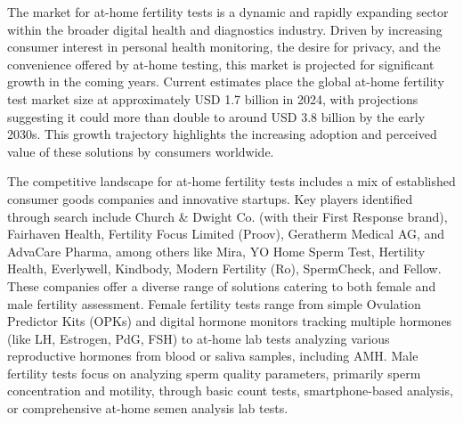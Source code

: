 \documentclass{article}
\begin{document}
The market for at-home fertility tests is a dynamic and rapidly expanding sector within the broader digital health and diagnostics industry. Driven by increasing consumer interest in personal health monitoring, the desire for privacy, and the convenience offered by at-home testing, this market is projected for significant growth in the coming years. Current estimates place the global at-home fertility test market size at approximately USD 1.7 billion in 2024, with projections suggesting it could more than double to around USD 3.8 billion by the early 2030s. This growth trajectory highlights the increasing adoption and perceived value of these solutions by consumers worldwide.

The competitive landscape for at-home fertility tests includes a mix of established consumer goods companies and innovative startups. Key players identified through search include Church \& Dwight Co. (with their First Response brand), Fairhaven Health, Fertility Focus Limited (Proov), Geratherm Medical AG, and AdvaCare Pharma, among others like Mira, YO Home Sperm Test, Hertility Health, Everlywell, Kindbody, Modern Fertility (Ro), SpermCheck, and Fellow. These companies offer a diverse range of solutions catering to both female and male fertility assessment. Female fertility tests range from simple Ovulation Predictor Kits (OPKs) and digital hormone monitors tracking multiple hormones (like LH, Estrogen, PdG, FSH) to at-home lab tests analyzing various reproductive hormones from blood or saliva samples, including AMH. Male fertility tests focus on analyzing sperm quality parameters, primarily sperm concentration and motility, through basic count tests, smartphone-based analysis, or comprehensive at-home semen analysis lab tests.
\end{document}

